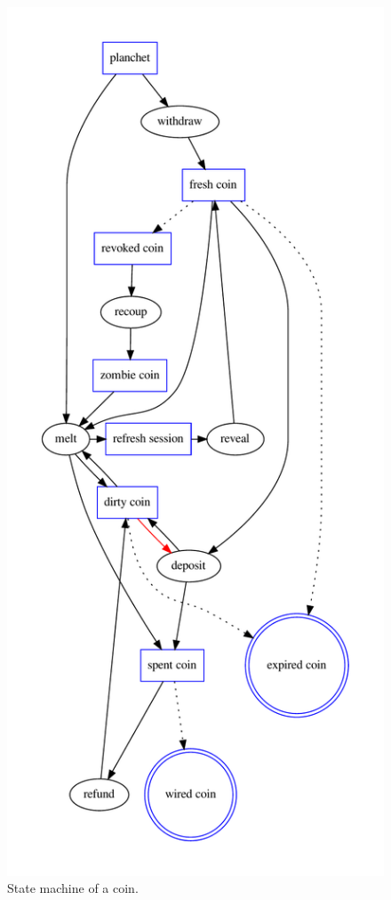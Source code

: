 \begin{figure}
  \begin{center}
    \includegraphics[scale=0.65]{taler/coin.pdf}
  \end{center}
  \caption{State machine of a coin.}
  \label{fig:coin:states}
\end{figure}





